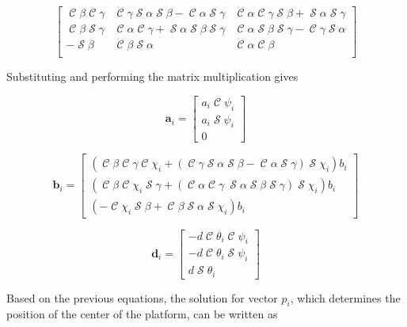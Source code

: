 \documentclass[titlepage, letterpaper]{article}
\DeclareMathOperator{\cose}{\mathcal{C}}
\DeclareMathOperator{\sen}{\mathcal{S}}
\begin{document}
\begin{equation}
\label{eq:RM_matrix}
\begin{bmatrix}
 \cose \beta  \cose \gamma  & \cose \gamma  \sen \alpha  \sen \beta -\cose \alpha  \sen \gamma  & \cose \alpha  \cose \gamma  \sen \beta +\sen \alpha  \sen \gamma  \\
 \cose \beta  \sen \gamma  & \cose \alpha  \cose \gamma +\sen \alpha  \sen \beta  \sen \gamma  & \cose \alpha  \sen \beta  \sen \gamma -\cose \gamma  \sen \alpha  \\
 -\sen \beta  & \cose \beta  \sen \alpha  & \cose \alpha  \cose \beta  \\
\end{bmatrix}
\end{equation}

Substituting and performing the matrix multiplication gives

\begin{equation}
    \label{eq:a_substitute}
    \mathbf{a}_i =
    \begin{bmatrix}
    a_i \cose \psi_i \\
    a_i \sen \psi_i \\
    0
    \end{bmatrix}
\end{equation}

\begin{equation}
    \label{eq:b_substitute}
    \mathbf{b}_i =
    \begin{bmatrix}
    (\cose \beta \cose \gamma \cose \chi_i + (\cose \gamma \sen \alpha \sen \beta - \cose \alpha \sen \gamma)\sen \chi_i) b_i \\
    (\cose \beta \cose \chi_i \sen \gamma + (\cose \alpha \cose \gamma \ \sen \alpha \sen \beta \sen \gamma)\sen \chi_i) b_i \\
    (-\cose \chi_i \sen \beta + \cose \beta \sen \alpha \sen \chi_i) b_i
    \end{bmatrix}
\end{equation}

\begin{equation}
    \label{eq:d_substitute}
    \mathbf{d}_i =
    \begin{bmatrix}
    -d \cose \theta_i \cose \psi_i \\
    -d \cose \theta_i \sen \psi_i \\
    d \sen \theta_i
    \end{bmatrix}
\end{equation}

Based on the previous equations, the solution for vector $p_i$, which determines the position of the center of the platform, can be written as
\end{document}
